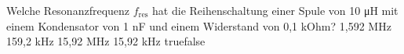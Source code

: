     {Welche Resonanzfrequenz $f_{\textrm{res}}$ hat die Reihenschaltung einer Spule von 10 \si{\micro\henry} mit einem Kondensator von 1 nF und einem Widerstand von 0,1 kOhm?}
    {1,592 MHz}
    {159,2 kHz}
    {15,92 MHz}
    {15,92 kHz}
    {true}{false}
